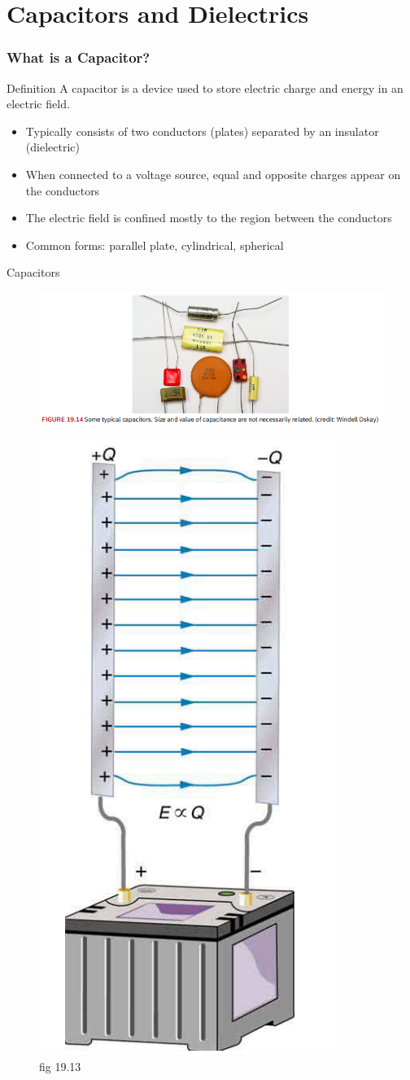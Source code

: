 \documentclass{beamer}
\begin{document}
\section{Capacitors and Dielectrics}

\begin{frame}
    \frametitle{What is a Capacitor?}
    
    \begin{block}{Definition}
        A capacitor is a device used to store electric charge and energy in an electric field.
    \end{block}
    
    \begin{itemize}
        \item Typically consists of two conductors (plates) separated by an insulator (dielectric)
        \item When connected to a voltage source, equal and opposite charges appear on the conductors
        \item The electric field is confined mostly to the region between the conductors
        \item Common forms: parallel plate, cylindrical, spherical
    \end{itemize}
    \end{frame}

\begin{frame}{Capacitors}
    \begin{figure}
        \centering
        \includegraphics[width=1\linewidth]{caps.png}
    \end{figure}
\end{frame}

\begin{frame}
   \begin{figure}
       \centering
       \includegraphics[width=0.3\linewidth]{cap.png}
       \caption{fig 19.13}
   \end{figure}
\end{frame}
\end{document}
